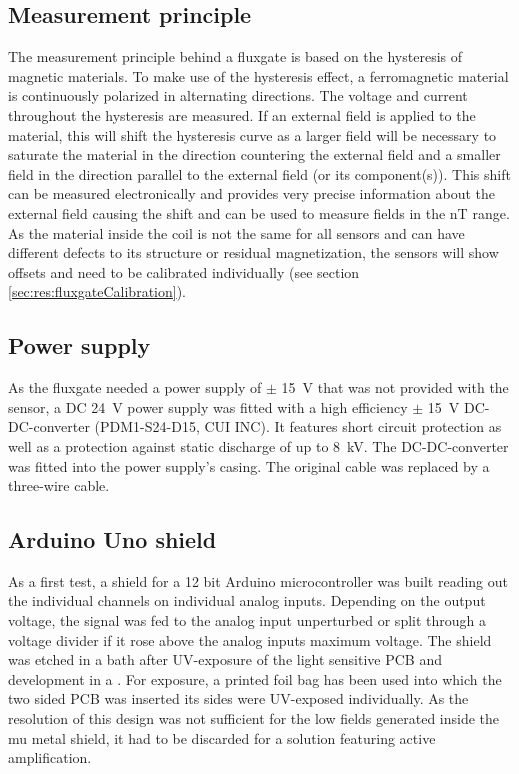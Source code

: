         \subsection{Measurement principle}
        \label{sec:matMeth:fluxgateMeasurementPrinciple}
        The measurement principle behind a fluxgate is based on the hysteresis of magnetic materials. To make use of the hysteresis effect, a ferromagnetic material is continuously polarized in alternating directions. The voltage and current throughout the hysteresis are measured. If an external field is applied to the material, this will shift the hysteresis curve as a larger field will be necessary to saturate the material in the direction countering the external field and a smaller field in the direction parallel to the external field (or its component(s)). This shift can be measured electronically and provides very precise information about the external field causing the shift and can be used to measure fields in the \si{\nano\tesla} range. As the material inside the coil is not the same for all sensors and can have different defects to its structure or residual magnetization, the sensors will show offsets and need to be calibrated individually (see section \ref{sec:res:fluxgateCalibration}).
        \subsection{Power supply}
        As the fluxgate needed a power supply of $\pm$ \SI{15}{\volt} that was not provided with the sensor, a DC \SI{24}{\volt} power supply was fitted with a high efficiency $\pm$ \SI{15}{\volt} DC-DC-converter (PDM1-S24-D15, CUI INC). It features short circuit protection as well as a protection against static discharge of up to \SI{8}{\kilo\volt}. The DC-DC-converter was fitted into the power supply's casing. The original cable was replaced by a three-wire cable.
        \subsection{Arduino Uno shield}
            As a first test, a shield for a 12 bit Arduino microcontroller was built reading out the individual channels on individual analog inputs.  Depending on the output voltage, the signal was fed to the analog input unperturbed or split through a voltage divider if it rose above the analog inputs maximum voltage.  The shield was etched in a  bath after UV-exposure of the light sensitive PCB and development in a .  For exposure, a printed foil bag has been used into which the two sided PCB was inserted  its sides were UV-exposed individually.  As the resolution of this design was not sufficient for the low fields generated inside the mu metal shield, it had to be discarded for a solution featuring active amplification.
